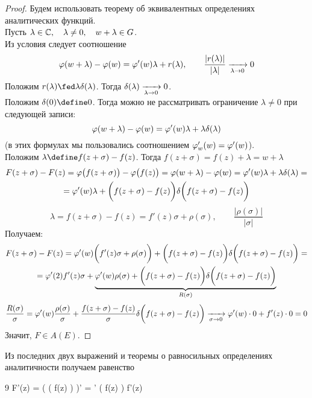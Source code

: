 \begin{proof}
	Будем использовать теорему об эквивалентных определениях аналитических функций. \\
	Пусть $ \lambda \in \mathbb{C}, \quad \lambda \ne 0, \quad w + \lambda \in G $. \\
	Из условия следует соотношение
	$$ \varphi(w + \lambda) - \varphi(w) = \varphi'(w) \lambda + r(\lambda), \qquad \frac{|r(\lambda)|}{|\lambda|} \xrightarrow[\lambda \to 0]{} 0 $$
	Положим $ r(\lambda) \fed \lambda \delta(\lambda) $. Тогда $ \delta(\lambda) \xrightarrow[\lambda \to 0]{} 0 $. \\
	Положим $ \delta(0) \define 0 $. Тогда можно не рассматривать ограничение $ \lambda \ne 0 $ при следующей записи:
	$$ \varphi(w + \lambda) - \varphi(w) = \varphi'(w)\lambda + \lambda \delta(\lambda) $$
	(в этих формулах мы пользовались соотношением $ \varphi_w'(w) = \varphi'(w) $). \\
	Положим $ \lambda \define f(z + \sigma) - f(z) $. Тогда $ f(z + \sigma) = f(z) + \lambda = w + \lambda $
	\begin{multline*}
		F(z + \sigma) - F(z) = \varphi \big( f(z + \sigma) \big) - \varphi \big( f(z) \big) = \varphi(w + \lambda) - \varphi(w) = \varphi'(w) \lambda + \lambda \delta(\lambda) = \\
		= \varphi'(w)\lambda + \bigg( f(z + \sigma) - f(z) \bigg) \delta \bigg( f(z + \sigma) - f(z) \bigg)
	\end{multline*}
	$$ \lambda = f(z + \sigma) - f(z) = f'(z)\sigma + \rho(\sigma), \qquad \frac{|\rho(\sigma)|}{|\sigma|} $$
	Получаем:
	\begin{multline*}
		F(z + \sigma) - F(z) = \varphi'(w) \bigg( f'(z) \sigma + \rho(\sigma) \bigg) + \bigg( f(z + \sigma) - f(z) \bigg) \delta \bigg( f(z + \sigma) - f(z) \bigg) = \\
		= \varphi'(2)f'(z) \sigma + \underbrace{\varphi'(w)\rho(\sigma) + \bigg( f(z + \sigma) - f(z) \bigg) \delta \bigg( f(z + \sigma) - f(z) \bigg)}_{R(\sigma)}
	\end{multline*}
	$$ \frac{R(\sigma)}\sigma = \varphi'(w) \frac{\rho(\sigma)}\sigma + \frac{f(z + \sigma) - f(z)}\sigma \delta \bigg( f(z + \sigma) - f(z) \bigg) \xrightarrow[\sigma \to 0]{} \varphi'(w) \cdot 0 + f'(z) \cdot 0 = 0 $$
	Значит, $ F \in A(E) $.
\end{proof}

\begin{implication}
	Из последних двух выражений и теоремы о равносильных определениях аналитичности получаем равенство
	\begin{equ}9
		F'(z) = \bigg( \vphi \big( f(z) \big) \bigg)' = \vphi' \big( f(z) \big) \cdot f'(z)
	\end{equ}
\end{implication}


